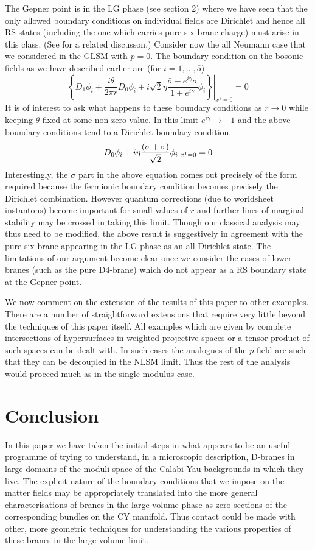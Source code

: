 \documentclass[a4paper,12pt]{article}
\begin{document}
The Gepner point is in the LG phase (see section 2) 
where  we have seen that the only allowed boundary conditions
on individual fields are Dirichlet and hence all RS states
(including the one which carries pure six-brane charge)
must arise in this class. (See \cite{doug-diac} for a related
discusson.)  Consider now the all Neumann case
that we considered in the GLSM with $p=0$. 
The boundary condition on the bosonic fields as we have described
earlier are
(for $i=1,\ldots,5$)
$$
\left.\left\{D_1\phi_i+\frac{i\theta}{2\pi r}
D_0\phi_i+i\sqrt{2}\eta
\frac{{\bar \sigma}-e^{i\gamma}\sigma}{1+e^{i\gamma}}\phi_i
\right\}\right|_{x^1=0}=0 
$$
It is of interest to ask what happens to these boundary conditions
as $r \rightarrow 0$ while keeping $\theta$ fixed at some non-zero
value. In this limit $e^{i\gamma}\rightarrow -1$ and the above boundary
conditions tend to a Dirichlet boundary condition.
$$
D_0\phi_i+i\eta {{({\bar \sigma}+\sigma)}\over\sqrt{2}}\phi_i|_{x^1=0}=0 
$$
Interestingly, the $\sigma$ part in the above equation
comes out precisely of the form required because the fermionic
boundary condition becomes precisely the Dirichlet combination.
However quantum corrections (due to worldsheet
instantons) become important for small values of $r$ and further 
lines of marginal stability may be crossed in taking this limit. Though our
classical analysis may thus need to be modified, the above
result  is suggestively in agreement with the pure six-brane
appearing in the LG phase as an all Dirichlet state.
The limitations of our argument become clear once we consider
the cases of lower branes (such as the pure D4-brane) which do not
appear as a RS boundary state at the Gepner point.

We now comment on the extension of the results of this paper to other
examples. There are a number of straightforward extensions that require
very little beyond the techniques of this paper itself. 
All examples which are given by complete intersections of hypersurfaces
in weighted projective spaces or a tensor product of such spaces can be dealt
with. In such cases the analogues of the $p$-field are such that they
can be decoupled in the NLSM limit. Thus the rest of the analysis would
proceed much as in the single modulus case.



\section{Conclusion}
  In this paper we have taken the initial steps in what appears to 
be an useful programme of trying to understand, in a microscopic
description, D-branes in large domains
of the moduli space of the Calabi-Yau backgrounds in which they live.
The explicit nature of the boundary conditions that we impose on the
matter fields may be appropriately translated into the more general
characterisations of branes in the large-volume phase as zero sections
of the corresponding bundles on the CY manifold. Thus contact could be
made with other, more geometric techniques for understanding the
various properties of these branes in the large volume limit.  
\end{document}
